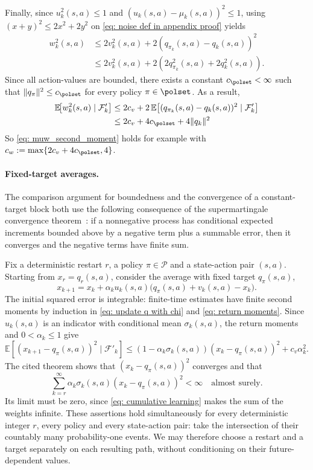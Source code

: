 Finally, since $u_k^2(s,a) \le 1$ and $(u_k(s,a) - \mu_k(s,a))^2 \le 1$,
using $(x+y)^2 \le 2 x^2 + 2 y^2$ on \eqref{eq: noise def in appendix proof} yields
\begin{align*}
w_k^2(s,a) 
&\le 2 v_k^2(s,a) + 2 (q_{\pi_k}(s,a)-q_k(s,a) )^2 
\\
&\le 2 v_k^2(s,a) + 2 ( 2 q_{\pi_k}^2(s,a) + 2 q_k^2(s,a) ) .
\end{align*}
Since all action-values are bounded,
there exists a constant $c_\polset < \infty$ such that $\|q_\pi\|^2 \leq c_\polset$ for every policy $\pi \in \polset$. As a result,
\begin{align*}
\mathbb E \!\big[ w_{k}^2(s,a) \mid \mathcal F'_k \big]
&\le
2 c_v + 2 \, \mathbb E \!\left[ ( q_{\pi_k}(s,a)-q_k(s,a) )^2 \mid \mathcal F'_k \right]
\\
&\le
2 c_v + 4 c_\polset + 4 \|q_k\|^2
\end{align*}
So \eqref{eq: muw_second_moment} holds for example with $c_w := \max \{ 2 c_v + 4 c_\polset, 4\}$.
\hfill \BlackBox



\paragraph{Fixed-target averages.}
\label{app: fixed target averages}
The comparison argument for boundedness and the convergence of a constant-target block both use the following consequence of the supermartingale convergence theorem~\citep[Proposition~4.2]{Bertsekas1996Neuro-DynamicProgramming}: if a nonnegative process has conditional expected increments bounded above by a negative term plus a summable error, then it converges and the negative terms have finite sum.

Fix a deterministic restart $r$, a policy $\pi\in\mathcal P$ and a state-action pair $(s,a)$.
Starting from $x_r=q_r(s,a)$, consider the average with fixed target $q_\pi(s,a)$,
\[
x_{k+1}=x_k+\alpha_k u_k(s,a)\big(q_\pi(s,a)+v_k(s,a)-x_k\big).
\]
The initial squared error is integrable: finite-time estimates have finite second moments by induction in \eqref{eq: update q with chi} and \eqref{eq: return moments}.
Since $u_k(s,a)$ is an indicator with conditional mean $\sigma_k(s,a)$, the return moments and $0<\alpha_k\le1$ give
\[
\mathbb E\!\left[(x_{k+1}-q_\pi(s,a))^2\mid\mathcal F'_k\right]
\le (1-\alpha_k\sigma_k(s,a))(x_k-q_\pi(s,a))^2+c_v\alpha_k^2.
\]
The cited theorem shows that $(x_k-q_\pi(s,a))^2$ converges and that
\[
\sum_{k=r}^{\infty}\alpha_k\sigma_k(s,a)(x_k-q_\pi(s,a))^2<\infty
\quad\text{almost surely}.
\]
Its limit must be zero, since \eqref{eq: cumulative learning} makes the sum of the weights infinite.
These assertions hold simultaneously for every deterministic integer $r$, every policy and every state-action pair: take the intersection of their countably many probability-one events. We may therefore choose a restart and a target separately on each resulting path, without conditioning on their future-dependent values.

